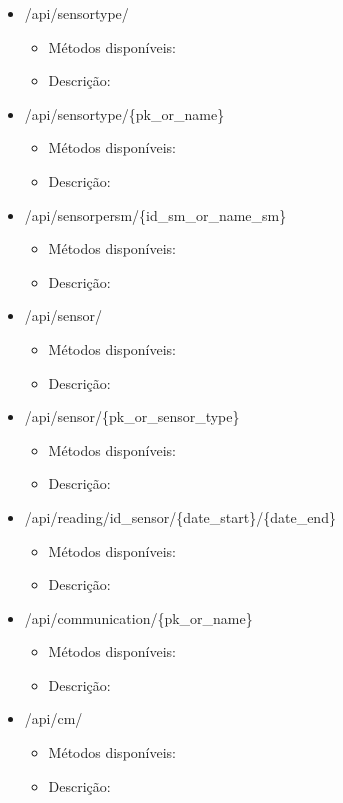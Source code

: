 \begin{itemize}
	
	\item /api/sensortype/
	\begin{itemize}
		\item Métodos disponíveis: 
		\item Descrição: 
	\end{itemize}
	
	
	\item /api/sensortype/\{pk\_or\_name\}
	\begin{itemize}
		\item Métodos disponíveis: 
		\item Descrição: 
	\end{itemize}
	
	
	\item /api/sensorpersm/\{id\_sm\_or\_name\_sm\}
	\begin{itemize}
		\item Métodos disponíveis: 
		\item Descrição: 
	\end{itemize}
	
	
	\item /api/sensor/
	\begin{itemize}
		\item Métodos disponíveis: 
		\item Descrição: 
	\end{itemize}
	
	
	\item /api/sensor/\{pk\_or\_sensor\_type\}
	\begin{itemize}
		\item Métodos disponíveis: 
		\item Descrição: 
	\end{itemize}
	
	
	\item /api/reading/{id\_sensor}/\{date\_start\}/\{date\_end\}
	\begin{itemize}
		\item Métodos disponíveis: 
		\item Descrição: 
	\end{itemize}
	
	
	\item /api/communication/\{pk\_or\_name\}
	\begin{itemize}
		\item Métodos disponíveis: 
		\item Descrição: 
	\end{itemize}
	
	
	\item /api/cm/
	\begin{itemize}
		\item Métodos disponíveis: 
		\item Descrição: 
	\end{itemize}
	

\end{itemize}
